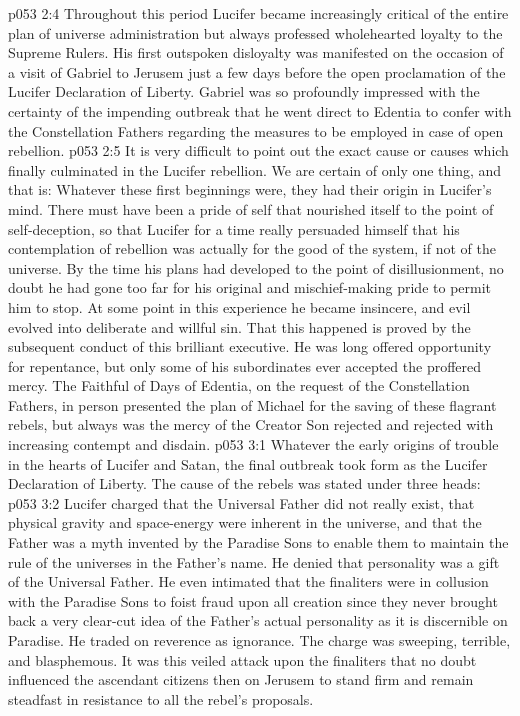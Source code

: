 \vs p053 2:4 Throughout this period Lucifer became increasingly critical of the entire plan of universe administration but always professed wholehearted loyalty to the Supreme Rulers. His first outspoken disloyalty was manifested on the occasion of a visit of Gabriel to Jerusem just a few days before the open proclamation of the Lucifer Declaration of Liberty. Gabriel was so profoundly impressed with the certainty of the impending outbreak that he went direct to Edentia to confer with the Constellation Fathers regarding the measures to be employed in case of open rebellion.
\vs p053 2:5 It is very difficult to point out the exact cause or causes which finally culminated in the Lucifer rebellion. We are certain of only one thing, and that is: Whatever these first beginnings were, they had their origin in Lucifer’s mind. There must have been a pride of self that nourished itself to the point of self\hyp{}deception, so that Lucifer for a time really persuaded himself that his contemplation of rebellion was actually for the good of the system, if not of the universe. By the time his plans had developed to the point of disillusionment, no doubt he had gone too far for his original and mischief\hyp{}making pride to permit him to stop. At some point in this experience he became insincere, and evil evolved into deliberate and willful sin. That this happened is proved by the subsequent conduct of this brilliant executive. He was long offered opportunity for repentance, but only some of his subordinates ever accepted the proffered mercy. The Faithful of Days of Edentia, on the request of the Constellation Fathers, in person presented the plan of Michael for the saving of these flagrant rebels, but always was the mercy of the Creator Son rejected and rejected with increasing contempt and disdain.
\vs p053 3:1 Whatever the early origins of trouble in the hearts of Lucifer and Satan, the final outbreak took form as the Lucifer Declaration of Liberty. The cause of the rebels was stated under three heads:
\vs p053 3:2 \pc {}\bibnobreakspace {} Lucifer charged that the Universal Father did not really exist, that physical gravity and space\hyp{}energy were inherent in the universe, and that the Father was a myth invented by the Paradise Sons to enable them to maintain the rule of the universes in the Father’s name. He denied that personality was a gift of the Universal Father. He even intimated that the finaliters were in collusion with the Paradise Sons to foist fraud upon all creation since they never brought back a very clear\hyp{}cut idea of the Father’s actual personality as it is discernible on Paradise. He traded on reverence as ignorance. The charge was sweeping, terrible, and blasphemous. It was this veiled attack upon the finaliters that no doubt influenced the ascendant citizens then on Jerusem to stand firm and remain steadfast in resistance to all the rebel’s proposals.
